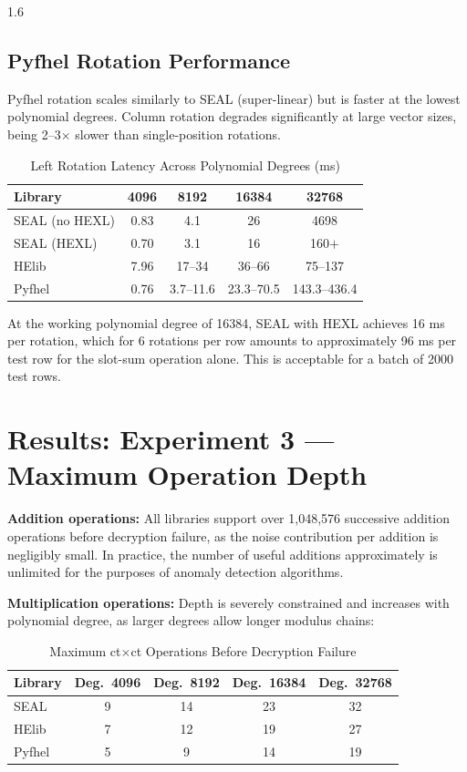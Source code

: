 \begin{spacing}{1.6}
\subsection{Pyfhel Rotation Performance}

Pyfhel rotation scales similarly to SEAL (super-linear) but is faster at the
lowest polynomial degrees. Column rotation degrades significantly at large vector
sizes, being 2--3$\times$ slower than single-position rotations.

\begin{table}[H]
\centering
\caption{Left Rotation Latency Across Polynomial Degrees (ms)}
\label{tab:rotation}
\begin{tabular}{lcccc}
\toprule
\textbf{Library} & \textbf{4096} & \textbf{8192} & \textbf{16384} & \textbf{32768} \\
\midrule
SEAL (no HEXL) & 0.83 & 4.1 & 26 & 4698 \\
SEAL (HEXL) & 0.70 & 3.1 & 16 & 160$+$ \\
HElib & 7.96 & 17--34 & 36--66 & 75--137 \\
Pyfhel & 0.76 & 3.7--11.6 & 23.3--70.5 & 143.3--436.4 \\
\bottomrule
\end{tabular}
\end{table}

At the working polynomial degree of 16384, SEAL with HEXL achieves 16 ms per
rotation, which for 6 rotations per row amounts to approximately 96 ms per
test row for the slot-sum operation alone. This is acceptable for a batch of
2000 test rows.

\section{Results: Experiment 3 --- Maximum Operation Depth}

\textbf{Addition operations:} All libraries support over 1,048,576 successive
addition operations before decryption failure, as the noise contribution per
addition is negligibly small. In practice, the number of useful additions approximately is
unlimited for the purposes of anomaly detection algorithms.

\textbf{Multiplication operations:} Depth is severely constrained and increases
with polynomial degree, as larger degrees allow longer modulus chains:

\begin{table}[H]
\centering
\caption{Maximum ct$\times$ct Operations Before Decryption Failure}
\label{tab:depth}
\begin{tabular}{lcccc}
\toprule
\textbf{Library} & \textbf{Deg.\ 4096} & \textbf{Deg.\ 8192} & \textbf{Deg.\ 16384} & \textbf{Deg.\ 32768} \\
\midrule
SEAL & 9 & 14 & 23 & 32 \\
HElib & 7 & 12 & 19 & 27 \\
Pyfhel & 5 & 9 & 14 & 19 \\
\bottomrule
\end{tabular}
\end{table}


\end{spacing}
